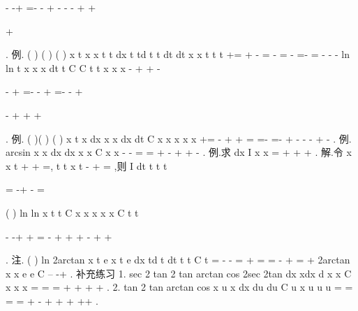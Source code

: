 -
-+
=-
-
+
-
-
-
+
+


+


\int 
. 
\textcolor{lyred}{例}.
(
)
(
)
(
)
x
t
x
x
t
t
dx
t
td
t
t
dt
dt
x
x
t
t
t
+=
+
-
=
-
=
-
\cdots 
=-
=
-
-
-
\int 
\int 
\int 
\int 
ln
ln
t
x
x
x
dt
t
C
C
t
t
x
x
x
-
+
+
-


-
+
=-
-
+
=-
-
+


-
+
+
+


\int 
. 
\textcolor{lyred}{例}.
(
)(
)
(
)
x
t
x
dx
x
x
dx
dt
C
x
x
x
x
x
+=
-
+
+
=
=-
=-
+
-
-
-
+
-
\int 
\int 
\int 
. 
\textcolor{lyred}{例}.
arcsin
x
x
dx
dx
x
x
C
x
x
-
-
=
=
+
-
+
+
-
\int 
\int 
.\textcolor{lyred}{ }
\textcolor{lyred}{例}.求
dx
I
x
x
=
+
+
+
\int 
. 
解.令
x
x
t
+
+
=,
t
t
x
t
-
+
=
,则
I
dt
t
t
t


=
-+
-
=




\int 
(
)
ln
ln
x
t
t
C
x
x
x
x x
C
t
t


-
-+
+
=
-
+
+
+
-
+
+




. 
\textcolor{lyred}{注}.
(
)
ln
2arctan
x
t
e
x
t
e
dx
td
t
dt
t
t
C
t
=
-
-
=
+
=
=
-
+
=
+
\int 
\int 
\int 
2arctan
x
x
e
e
C
--
-+
. 
\textcolor{lyred}{补充练习 }
1.
sec
2 tan
2 tan
arctan
cos
2sec
2tan
dx
xdx
d
x
x
C
x
x
x
=
=
=
+
+
+
+
\int 
\int 
\int 
. 
2.
tan 2
tan
arctan
cos
x
u
x
dx
du
du
C
u
x
u
u
u
=
=
\cdots 
=
=
+
-
+
+
+
++
\int 
\int 
\int 
. 